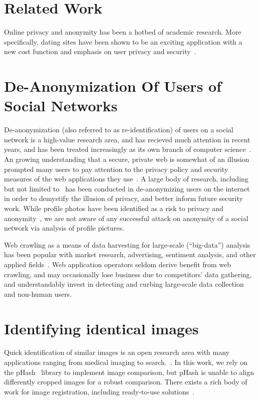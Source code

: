 \section{Related Work}
\label{sec:related}

Online privacy and anonymity has been a hotbed of academic research.
More specifically, dating sites have been shown to be an exciting application with a new cost function and emphasis on user privacy and security~\cite{okws}.


\section{De-Anonymization Of Users of Social Networks}
\label{sec:related_anon}

De-anonymization (also referred to as re-identification) of users on a social network is a high-value research area, and has recieved much attention in recent years, and has been treated increasingly as its own branch of computer science~\cite{reidentification1}.
An growing understanding that a secure, private web is somewhat of an illusion~\cite{webisnotsecure} prompted many users to pay attention to the privacy policy and security measures of the web applications they use~\cite{motivationforanonymity}.
A large body of research, including but not limited to~\cite{deanonsocial1,deanonsocial2,locationprivacy} has been conducted in de-anonymizing users on the internet in order to demystify the illusion of privacy, and better inform future security work.
While profile photos have been identified as a risk to privacy and anonymity~\cite{profilephotos1}, we are not aware of any successful attack on anonymity of a social network via analysis of profile pictures.

Web crawling as a means of data harvesting for large-scale (``big-data'') analysis has been popular with market research, advertising, sentiment analysis, and other applied fields~\cite{crawling1}.
Web application operators seldom derive benefit from web crawling, and may occasionally lose business due to competitors' data gathering, and understandably invest in detecting and curbing large-scale data collection~\cite{limitcrawling1, limitcrawling2, protectidentity1, protectidentity2} and non-human users.

\section{Identifying identical images}
\label{sec:related_images}

Quick identification of similar images is an open research area with many applications ranging from medical imaging to search.~\cite{nearduplicateimage1}. In this work, we rely on the pHash~\cite{phash} library to implement image comparison, but pHash is unable to align differently cropped images for a robust comparison. There exists a rich body of work for image registration, including ready-to-use solutions~\cite{registration3}.
